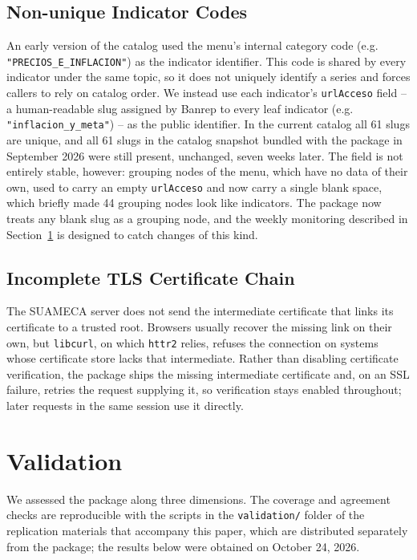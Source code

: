\documentclass[conference]{IEEEtran}
\begin{document}
\subsection{Non-unique Indicator Codes}
An early version of the catalog used the menu's internal category code
(e.g. \texttt{"PRECIOS\_E\_INFLACION"}) as the indicator identifier. This
code is shared by every indicator under the same topic, so it does not
uniquely identify a series and forces callers to rely on catalog order.
We instead use each indicator's \texttt{urlAcceso} field -- a
human-readable slug assigned by Banrep to every leaf indicator
(e.g. \texttt{"inflacion\_y\_meta"}) -- as the public identifier. In the
current catalog all 61 slugs are unique, and all 61 slugs in the catalog
snapshot bundled with the package in September 2026 were still present,
unchanged, seven weeks later. The field is not entirely stable, however: grouping nodes
of the menu, which have no data of their own, used to carry an empty
\texttt{urlAcceso} and now carry a single blank space, which briefly
made 44 grouping nodes look like indicators. The package now treats any
blank slug as a grouping node, and the weekly monitoring described in
Section~\ref{sec:validation} is designed to catch changes of this kind.

\subsection{Incomplete TLS Certificate Chain}
The SUAMECA server does not send the intermediate certificate that links
its certificate to a trusted root. Browsers usually recover the missing
link on their own, but \texttt{libcurl}, on which \texttt{httr2} relies,
refuses the connection on systems whose certificate store lacks that
intermediate. Rather than disabling certificate verification, the
package ships the missing intermediate certificate and, on an SSL
failure, retries the request supplying it, so verification stays enabled
throughout; later requests in the same session use it directly.

\section{Validation}
\label{sec:validation}

We assessed the package along three dimensions. The coverage and
agreement checks are reproducible with the scripts in the
\texttt{validation/} folder of the replication materials that accompany
this paper, which are distributed separately from the package; the
results below were obtained on October 24, 2026.
\end{document}
